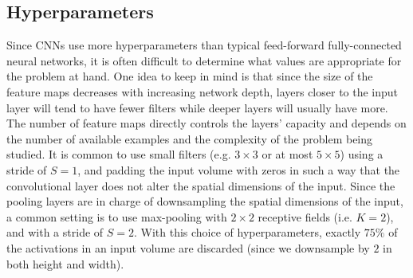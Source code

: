 \documentclass[../main.tex]{subfiles}
\begin{document}
\subsection{Hyperparameters}%
\label{subsec:ml_cnn_hyperparameters}
Since CNNs use more hyperparameters than typical feed-forward fully-connected neural networks, it is often difficult to
determine what values are appropriate for the problem at hand.
%
One idea to keep in mind is that since the size of the feature maps decreases with increasing network depth, layers
closer to the input layer will tend to have fewer filters while deeper layers will usually have more.
%
The number of feature maps directly controls the layers' capacity and depends on the number of available examples and
the complexity of the problem being studied.
%
It is common to use small filters (e.g. $3\times3$ or at most $5\times5$) using a stride of $S=1$, and padding
the input volume with zeros in such a way that the convolutional layer does not alter the spatial dimensions of the
input.
%
Since the pooling layers are in charge of downsampling the spatial dimensions of the input, a common setting is to use
max-pooling with $2\times2$ receptive fields (i.e. $K = 2$), and with a stride of $S = 2$.
%
With this choice of hyperparameters, exactly $75\%$ of the activations in an input volume are discarded (since we
downsample by $2$ in both height and width).
%
%
%
\end{document}
